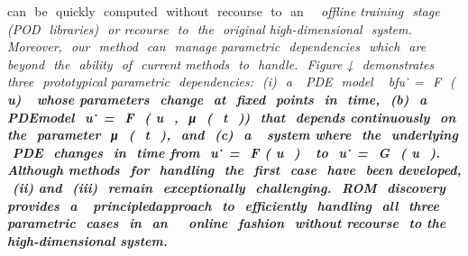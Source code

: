 \documentclass{article}
\begin{document}
can​ ​ be​ ​ quickly​ ​ computed​ ​ without​ ​ recourse​ ​ to​ ​ an​ ​ \em​ ​ offline​ ​ training​ ​ stage​ ​ (POD​ ​ libraries)​ ​ or
recourse​ ​ to​ ​ the​ ​ original​ ​ high-dimensional​ ​ system.​ ​ Moreover,​ ​ our​ ​ method​ ​ can​ ​ manage
parametric​ ​ dependencies​ ​ which​ ​ are​ ​ beyond​ ​ the​ ​ ability​ ​ of​ ​ current​ ​ methods​ ​ to​ ​ handle.​ ​ Figure ↓ ​
demonstrates​ ​ three​ ​ prototypical​ ​ parametric​ ​ dependencies:​ ​ (i)​ ​ a ​ ​ PDE​ ​ model​ \ ​ bfu ̇ = ​ F ​ (\bf​ u ​ ) ​ ​ whose
parameters​ ​ change​ ​ at​ ​ fixed​ ​ points​ ​ in​ ​ time,​ ​ (b)​ ​ a ​ ​ PDE​ ​ model​ ​ \bf u ̇ = ​ F ​ (\bf​ u ​ , ​ μ ​ ( ​ t ​ ))​ ​ that​ ​ depends
continuously​ ​ on​ ​ the​ ​ parameter​ ​ μ ​ ( ​ t ​ ),​ ​ and​ ​ (c)​ ​ a ​ ​ system​ ​ where​ ​ the​ ​ underlying​ ​ PDE​ ​ changes​ ​ in​ ​ time
from​ ​ \bf u ̇ = ​ F ​ (\bf​ u ​ ) ​ ​ to​ ​ \bf u ̇ = ​ G ​ (\bf​ u ​ ).​ ​ Although​ ​ methods​ ​ for​ ​ handling​ ​ the​ ​ first​ ​ case​ ​ have​ ​ been
developed,​ ​ (ii)​ ​ and​ ​ (iii)​ ​ remain​ ​ exceptionally​ ​ challenging.​ ​ ROM​ ​ discovery​ ​ provides​ ​ a ​ ​ principledapproach​ ​ to​ ​ efficiently​ ​ handling​ ​ all​ ​ three​ ​ parametric​ ​ cases​ ​ in​ ​ an​ ​ \em​ ​ online​ ​ fashion​ ​ without
recourse​ ​ to​ ​ the​ ​ high-dimensional​ ​ system.
\end{document}
